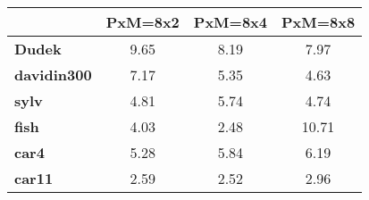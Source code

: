 \begin{tabular}{|l|c|c|c|}
\hline
&\textbf{PxM=8x2}&\textbf{PxM=8x4}&\textbf{PxM=8x8}\\\hline
\textbf{Dudek}&9.65&8.19&7.97\\\hline
\textbf{davidin300}&7.17&5.35&4.63\\\hline
\textbf{sylv}&4.81&5.74&4.74\\\hline
\textbf{fish}&4.03&2.48&10.71\\\hline
\textbf{car4}&5.28&5.84&6.19\\\hline
\textbf{car11}&2.59&2.52&2.96\\\hline
\end{tabular}
